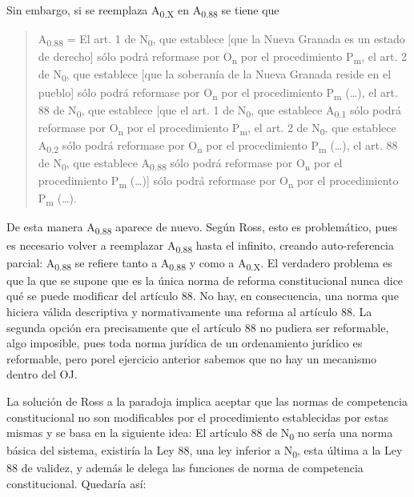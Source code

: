\documentclass[]{book}
\begin{document}
Sin embargo, si se reemplaza A\textsubscript{0.X} en
A\textsubscript{0.88} se tiene que

\begin{quote}
A\textsubscript{0.88} = El art. 1 de N\textsubscript{0}, que establece
{[}que la Nueva Granada es un estado de derecho{]} sólo podrá reformase
por O\textsubscript{n} por el procedimiento P\textsubscript{m}, el art.
2 de N\textsubscript{0}, que establece {[}que la soberanía de la Nueva
Granada reside en el pueblo{]} sólo podrá reformase por
O\textsubscript{n} por el procedimiento P\textsubscript{m} (\ldots{}),
el art. 88 de N\textsubscript{0}, que establece {[}que el art. 1 de
N\textsubscript{0}, que establece A\textsubscript{0.1} sólo podrá
reformase por O\textsubscript{n} por el procedimiento
P\textsubscript{m}, el art. 2 de N\textsubscript{0}, que establece
A\textsubscript{0.2} sólo podrá reformase por O\textsubscript{n} por el
procedimiento P\textsubscript{m} (\ldots{}), el art. 88 de
N\textsubscript{0}, que establece A\textsubscript{0.88} sólo podrá
reformase por O\textsubscript{n} por el procedimiento P\textsubscript{m}
(\ldots{}){]} sólo podrá reformase por O\textsubscript{n} por el
procedimiento P\textsubscript{m} (\ldots{}).
\end{quote}

De esta manera A\textsubscript{0.88} aparece de nuevo. Según Ross, esto
es problemático, pues es necesario volver a reemplazar
A\textsubscript{0.88} hasta el infinito, creando auto-referencia
parcial: A\textsubscript{0.88} se refiere tanto a A\textsubscript{0.88}
y como a A\textsubscript{0.X}. El verdadero problema es que la que se
supone que es la única norma de reforma constitucional nunca dice qué se
puede modificar del artículo 88. No hay, en consecuencia, una norma que
hiciera válida descriptiva y normativamente una reforma al artículo 88.
La segunda opción era precisamente que el artículo 88 no pudiera ser
reformable, algo imposible, pues toda norma jurídica de un ordenamiento jurídico es reformable, pero porel ejercicio anterior sabemos que no hay un mecanismo dentro del OJ.

La solución de Ross a la paradoja implica aceptar que las normas de
competencia constitucional no son modificables por el procedimiento
establecidas por estas mismas y se basa en la siguiente idea: El
artículo 88 de N\textsubscript{0} no sería una norma básica del sistema,
existiría la Ley 88, una ley inferior a N\textsubscript{0}, esta última
a la Ley 88 de validez, y además le delega las funciones de norma de
competencia constitucional. Quedaría así:
\end{document}
